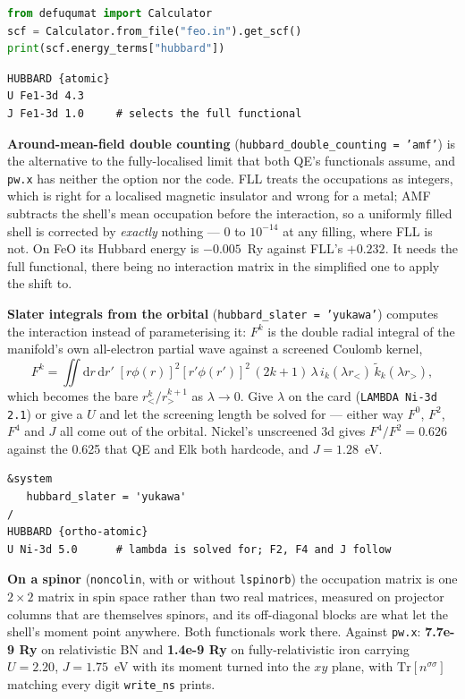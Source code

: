\documentclass[11pt,a4paper]{article}
\newcommand{\code}[1]{\texttt{\small #1}}
\begin{document}
\begin{lstlisting}[language=Python]
from defuqumat import Calculator
scf = Calculator.from_file("feo.in").get_scf()
print(scf.energy_terms["hubbard"])
\end{lstlisting}

\begin{lstlisting}
HUBBARD {atomic}
U Fe1-3d 4.3
J Fe1-3d 1.0     # selects the full functional
\end{lstlisting}

\textbf{Around-mean-field double counting} (\code{hubbard\_double\_counting =
'amf'}) is the alternative to the fully-localised limit that both QE's
functionals assume, and \code{pw.x} has neither the option nor the code. FLL
treats the occupations as integers, which is right for a localised magnetic
insulator and wrong for a metal; AMF subtracts the shell's mean occupation
before the interaction, so a uniformly filled shell is corrected by
\emph{exactly} nothing --- $0$ to $10^{-14}$ at any filling, where FLL is not.
On FeO its Hubbard energy is $-0.005$~Ry against FLL's $+0.232$. It needs the
full functional, there being no interaction matrix in the simplified one to
apply the shift to.

\textbf{Slater integrals from the orbital} (\code{hubbard\_slater = 'yukawa'})
computes the interaction instead of parameterising it: $F^k$ is the double
radial integral of the manifold's own all-electron partial wave against a
screened Coulomb kernel,
%
\[
  F^k = \iint \mathrm{d}r\,\mathrm{d}r'\;
        [r\phi(r)]^2 [r'\phi(r')]^2 \,
        (2k+1)\,\lambda\, i_k(\lambda r_<)\, \tilde k_k(\lambda r_>) ,
\]
%
which becomes the bare $r_<^k/r_>^{k+1}$ as $\lambda \to 0$. Give $\lambda$ on
the card (\code{LAMBDA Ni-3d 2.1}) or give a $U$ and let the screening length be
solved for --- either way $F^0$, $F^2$, $F^4$ and $J$ all come out of the
orbital. Nickel's unscreened 3d gives $F^4/F^2 = 0.626$ against the 0.625 that
QE and Elk both hardcode, and $J = 1.28$~eV.

\begin{lstlisting}
&system
   hubbard_slater = 'yukawa'
/
HUBBARD {ortho-atomic}
U Ni-3d 5.0      # lambda is solved for; F2, F4 and J follow
\end{lstlisting}

\textbf{On a spinor} (\code{noncolin}, with or without \code{lspinorb}) the
occupation matrix is one $2\times2$ matrix in spin space rather than two real
matrices, measured on projector columns that are themselves spinors, and its
off-diagonal blocks are what let the shell's moment point anywhere. Both
functionals work there. Against \code{pw.x}: \textbf{7.7e-9 Ry} on relativistic
BN and \textbf{1.4e-9 Ry} on fully-relativistic iron carrying $U = 2.20$,
$J = 1.75$~eV with its moment turned into the $xy$ plane, with
$\mathrm{Tr}[n^{\sigma\sigma}]$ matching every digit \code{write\_ns} prints.
\end{document}
